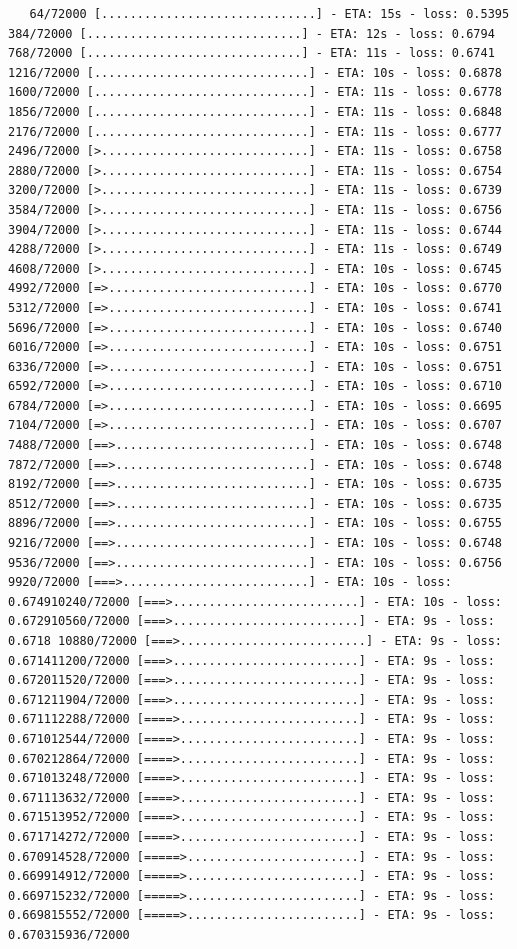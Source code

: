 \documentclass[12pt,fleqn]{article}\usepackage{../../common}
\begin{document}
\begin{verbatim}
   64/72000 [..............................] - ETA: 15s - loss: 0.5395  384/72000 [..............................] - ETA: 12s - loss: 0.6794  768/72000 [..............................] - ETA: 11s - loss: 0.6741 1216/72000 [..............................] - ETA: 10s - loss: 0.6878 1600/72000 [..............................] - ETA: 11s - loss: 0.6778 1856/72000 [..............................] - ETA: 11s - loss: 0.6848 2176/72000 [..............................] - ETA: 11s - loss: 0.6777 2496/72000 [>.............................] - ETA: 11s - loss: 0.6758 2880/72000 [>.............................] - ETA: 11s - loss: 0.6754 3200/72000 [>.............................] - ETA: 11s - loss: 0.6739 3584/72000 [>.............................] - ETA: 11s - loss: 0.6756 3904/72000 [>.............................] - ETA: 11s - loss: 0.6744 4288/72000 [>.............................] - ETA: 11s - loss: 0.6749 4608/72000 [>.............................] - ETA: 10s - loss: 0.6745 4992/72000 [=>............................] - ETA: 10s - loss: 0.6770 5312/72000 [=>............................] - ETA: 10s - loss: 0.6741 5696/72000 [=>............................] - ETA: 10s - loss: 0.6740 6016/72000 [=>............................] - ETA: 10s - loss: 0.6751 6336/72000 [=>............................] - ETA: 10s - loss: 0.6751 6592/72000 [=>............................] - ETA: 10s - loss: 0.6710 6784/72000 [=>............................] - ETA: 10s - loss: 0.6695 7104/72000 [=>............................] - ETA: 10s - loss: 0.6707 7488/72000 [==>...........................] - ETA: 10s - loss: 0.6748 7872/72000 [==>...........................] - ETA: 10s - loss: 0.6748 8192/72000 [==>...........................] - ETA: 10s - loss: 0.6735 8512/72000 [==>...........................] - ETA: 10s - loss: 0.6735 8896/72000 [==>...........................] - ETA: 10s - loss: 0.6755 9216/72000 [==>...........................] - ETA: 10s - loss: 0.6748 9536/72000 [==>...........................] - ETA: 10s - loss: 0.6756 9920/72000 [===>..........................] - ETA: 10s - loss: 0.674910240/72000 [===>..........................] - ETA: 10s - loss: 0.672910560/72000 [===>..........................] - ETA: 9s - loss: 0.6718 10880/72000 [===>..........................] - ETA: 9s - loss: 0.671411200/72000 [===>..........................] - ETA: 9s - loss: 0.672011520/72000 [===>..........................] - ETA: 9s - loss: 0.671211904/72000 [===>..........................] - ETA: 9s - loss: 0.671112288/72000 [====>.........................] - ETA: 9s - loss: 0.671012544/72000 [====>.........................] - ETA: 9s - loss: 0.670212864/72000 [====>.........................] - ETA: 9s - loss: 0.671013248/72000 [====>.........................] - ETA: 9s - loss: 0.671113632/72000 [====>.........................] - ETA: 9s - loss: 0.671513952/72000 [====>.........................] - ETA: 9s - loss: 0.671714272/72000 [====>.........................] - ETA: 9s - loss: 0.670914528/72000 [=====>........................] - ETA: 9s - loss: 0.669914912/72000 [=====>........................] - ETA: 9s - loss: 0.669715232/72000 [=====>........................] - ETA: 9s - loss: 0.669815552/72000 [=====>........................] - ETA: 9s - loss: 0.670315936/72000 
\end{verbatim}
\end{document}
